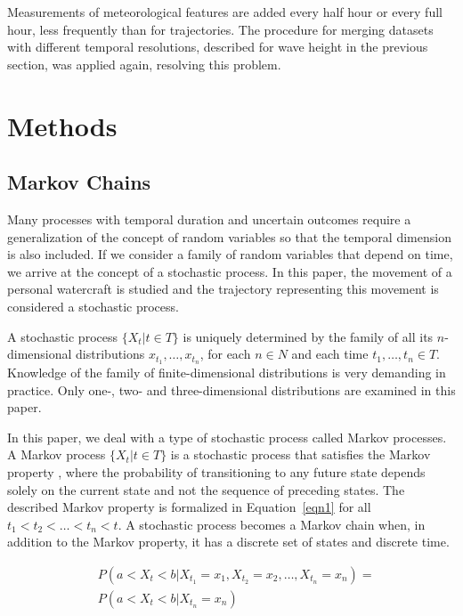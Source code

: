 \documentclass[preprint,12pt]{elsarticle}
\begin{document}
Measurements of meteorological features are added every half hour or every full hour, less frequently than for trajectories. The procedure for merging datasets with different temporal resolutions, described for wave height in the previous section, was applied again, resolving this problem.

\section{Methods}
\label{sec:Methods}

\subsection{Markov Chains}

Many processes with temporal duration and uncertain outcomes require a generalization of the concept of random variables so that the temporal dimension is also included. If we consider a family of random variables that depend on time, we arrive at the concept of a stochastic process. In this paper, the movement of a personal watercraft is studied and the trajectory representing this movement is considered a stochastic process.

A stochastic process $\{X_{t}|t\in T\}$ is uniquely determined by the family of all its $n$-dimensional distributions $x_{t_{1}}, \dots, x_{t_{n}}$, for each $n \in N$ and each time $t_{1}, \dots, t_{n} \in T$. Knowledge of the family of finite-dimensional distributions is very demanding in practice. Only one-, two- and three-dimensional distributions are examined in this paper.

In this paper, we deal with a type of stochastic process called Markov processes. A Markov process $\{X_{t}|t\in T\}$ is a stochastic process that satisfies the Markov property \citep{Gagniuc}, where the probability of transitioning to any future state depends solely on the current state and not the sequence of preceding states. The described Markov property is formalized in Equation~\ref{eqn1} for all $t_{1} < t_{2} < \dots < t_{n} < t$. A stochastic process becomes a Markov chain when, in addition to the Markov property, it has a discrete set of states and discrete time.

\begin{equation} \label{eqn1}
    \begin{aligned}
        & P(a<X_{t}<b|X_{t_{1}}=x_{1}, X_{t_{2}}=x_{2}, \dots, X_{t_{n}}=x_{n}) = \\
     &P(a<X_{t}<b|X_{t_{n}}=x_{n})  
    \end{aligned}
\end{equation}  
\end{document}
